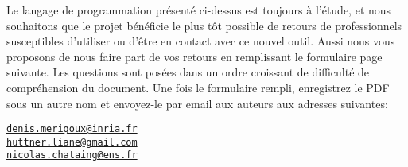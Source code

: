 \documentclass[12pt, french]{article}
\begin{document}
Le langage de programmation présenté ci-dessus est toujours à l'étude, et nous souhaitons que le projet bénéficie le plus tôt possible de retours de professionnels susceptibles d'utiliser ou d'être en contact avec ce nouvel outil. Aussi nous vous proposons de nous faire part de vos retours en remplissant le formulaire page suivante. Les questions sont posées dans un ordre croissant de difficulté de compréhension du document. Une fois le formulaire rempli, enregistrez le PDF sous un autre nom et envoyez-le par email aux auteurs aux adresses suivantes:

\begin{center}
  \href{mailto:denis.merigoux@inria.fr}{\texttt{denis.merigoux@inria.fr}}\\[0.5em]
  \href{mailto:huttner.liane@gmail.com}{\texttt{huttner.liane@gmail.com}}\\[0.5em]
  \href{mailto:nicolas.chataing@ens.fr}{\texttt{nicolas.chataing@ens.fr}}
\end{center}

\clearpage
\end{document}
